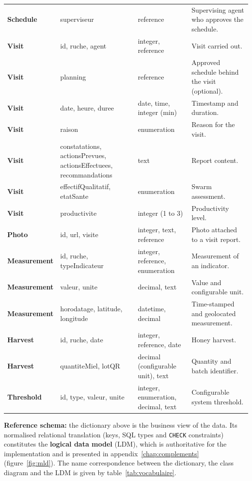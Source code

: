 \begin{xltabular}{\textwidth}{>{\bfseries}p{2.6cm} p{3.4cm} p{2.4cm} X}
Schedule & superviseur & reference & Supervising agent who approves the schedule. \\
Visit & id, ruche, agent & integer, reference & Visit carried out. \\
Visit & planning & reference & Approved schedule behind the visit (optional). \\
Visit & date, heure, duree & date, time, integer (min) & Timestamp and duration. \\
Visit & raison & enumeration & Reason for the visit. \\
Visit & constatations, actionsPrevues, actionsEffectuees, recommandations & text & Report content. \\
Visit & effectifQualitatif, etatSante & enumeration & Swarm assessment. \\
Visit & productivite & integer (1 to 3) & Productivity level. \\
Photo & id, url, visite & integer, text, reference & Photo attached to a visit report. \\
Measurement & id, ruche, typeIndicateur & integer, reference, enumeration & Measurement of an indicator. \\
Measurement & valeur, unite & decimal, text & Value and configurable unit. \\
Measurement & horodatage, latitude, longitude & datetime, decimal & Time-stamped and geolocated measurement. \\
Harvest & id, ruche, date & integer, reference, date & Honey harvest. \\
Harvest & quantiteMiel, lotQR & decimal (configurable unit), text & Quantity and batch identifier. \\
Threshold & id, type, valeur, unite & integer, enumeration, decimal, text & Configurable system threshold. \\
\bottomrule
\end{xltabular}

\begin{encadre}
\textbf{Reference schema:} the dictionary above is the business view of the
data. Its normalised relational translation (keys, SQL types and \texttt{CHECK}
constraints) constitutes the \textbf{logical data model} (LDM), which is
authoritative for the implementation and is presented in
appendix~\ref{chap:complements} (figure~\ref{fig:mld}). The name correspondence
between the dictionary, the class diagram and the LDM is given by
table~\ref{tab:vocabulaire}.
\end{encadre}

